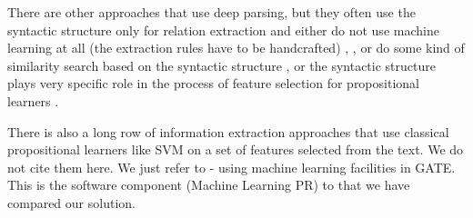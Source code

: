 \documentclass[runningheads,a4paper]{llncs}
\begin{document}


There are other approaches that use deep parsing, but they often use the syntactic structure only for relation extraction and either do not use machine learning at all (the extraction rules have to be handcrafted) 
\cite{Yakushiji2001},
\cite{RelEx},
\cite{Buyko:dependencyGraphs}
or do some kind of similarity search based on the syntactic structure
\cite{Etzioni08informationExtraction},
\cite{Wang:SimilarityTreeSkeletons}
or the syntactic structure plays very specific role in the process of feature selection for propositional learners %
\cite{Bunescu:DependencyPaths}.

There is also a long row of information extraction approaches that use classical propositional learners like SVM on a set of features selected from the text. We do not cite them here. We just refer to \cite{Yaoyong09a} - using machine learning facilities in GATE. This is the software component (Machine Learning PR) to that we have compared our solution.
\end{document}
